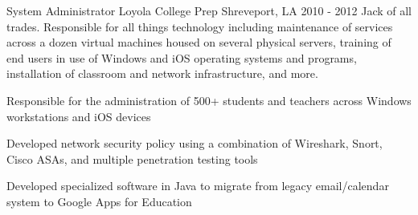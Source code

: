 \begin{cventries}
  \cventrysix
    {System Administrator} %
    {Loyola College Prep} %
    {Shreveport, LA} %
    {2010 - 2012} %
    {Jack of all trades.  Responsible for all things technology including maintenance of services across a dozen virtual machines housed on several physical servers, training of end users in use of Windows and iOS operating systems and programs, installation of classroom and network infrastructure, and more.} %
    {
      \begin{cvitems} %
        \item {Responsible for the administration of 500+ students and teachers across Windows workstations and iOS devices}
        \item {Developed network security policy using a combination of Wireshark, Snort, Cisco ASAs, and multiple penetration testing tools}
        \item {Developed specialized software in Java to migrate from legacy email/calendar system to Google Apps for Education}
      \end{cvitems}
    }

\end{cventries}
